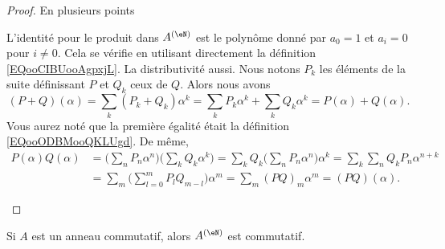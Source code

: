 \begin{proof}
	En plusieurs points
	\begin{subproof}
		\spitem[Anneau]
		L'identité pour le produit dans \( A^{(\eN)}\) est le polynôme donné par \( a_0=1\) et \( a_i=0\) pour \( i\neq 0\). Cela se vérifie en utilisant directement la définition \eqref{EQooCIBUooAgpxjL}. La distributivité aussi.
		\spitem[Le morphisme]
		Nous notons \( P_k\) les éléments de la suite définissant \( P\) et \( Q_k\) ceux de \( Q\). Alors nous avons
		\begin{equation}
			(P+Q)(\alpha)=\sum_k(P_k+Q_k)\alpha^k=\sum_kP_k\alpha^k+\sum_kQ_k\alpha^k=P(\alpha)+Q(\alpha).
		\end{equation}
		Vous aurez noté que la première égalité était la définition \eqref{EQooODBMooQKLUgd}. De même,
		\begin{subequations}
			\begin{align}
				P(\alpha)Q(\alpha) & =\big( \sum_nP_n\alpha^n \big)\big( \sum_kQ_k\alpha^k \big)=\sum_kQ_k\big( \sum_nP_n\alpha^n \big)\alpha^k=\sum_k\sum_nQ_kP_n\alpha^{n+k} \\
				                   & =\sum_m\big( \sum_{l=0}^mP_lQ_{m-l} \big)\alpha^m=\sum_m(PQ)_m\alpha^m=(PQ)(\alpha).
			\end{align}
		\end{subequations}
	\end{subproof}
\end{proof}

\begin{lemma}       \label{LEMooWVUXooQlaepO}
	Si \( A\) est un anneau commutatif, alors \( A^{(\eN)}\) est commutatif.
\end{lemma}

